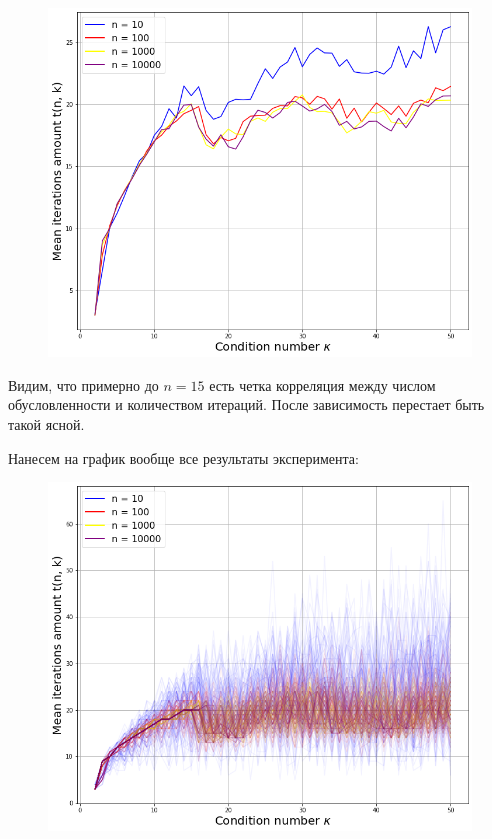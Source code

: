 \documentclass[14pt]{article}
\begin{document}
\begin{figure}[h]
	\includegraphics[width=\textwidth]{mean_kappa.png}
\end{figure}

 Видим, что примерно до $n = 15$ есть четка корреляция между числом обусловленности и количеством итераций. После зависимость перестает быть такой ясной.
 
 \newpage
 
 Нанесем на график вообще все результаты эксперимента:
 
\begin{figure}[h]
	\includegraphics[width=\textwidth]{all_kappa.png}
\end{figure}
\end{document}
